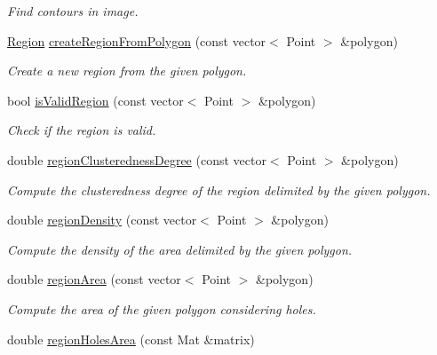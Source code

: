 \begin{DoxyCompactItemize}
\begin{DoxyCompactList}\small\item\em Find contours in image. \end{DoxyCompactList}\item 
\hyperlink{classmultiscale_1_1analysis_1_1Region}{Region} \hyperlink{classmultiscale_1_1analysis_1_1RegionDetector_a1416b365f921e02e5161d72b0b69f287}{create\-Region\-From\-Polygon} (const vector$<$ Point $>$ \&polygon)
\begin{DoxyCompactList}\small\item\em Create a new region from the given polygon. \end{DoxyCompactList}\item 
bool \hyperlink{classmultiscale_1_1analysis_1_1RegionDetector_a2be058ae797d80787725ae2c246ba256}{is\-Valid\-Region} (const vector$<$ Point $>$ \&polygon)
\begin{DoxyCompactList}\small\item\em Check if the region is valid. \end{DoxyCompactList}\item 
double \hyperlink{classmultiscale_1_1analysis_1_1RegionDetector_a89995b72e578951ea7ddf43c5c25e14a}{region\-Clusteredness\-Degree} (const vector$<$ Point $>$ \&polygon)
\begin{DoxyCompactList}\small\item\em Compute the clusteredness degree of the region delimited by the given polygon. \end{DoxyCompactList}\item 
double \hyperlink{classmultiscale_1_1analysis_1_1RegionDetector_a6beb6b2ecaccd60130bcf8dd808750b8}{region\-Density} (const vector$<$ Point $>$ \&polygon)
\begin{DoxyCompactList}\small\item\em Compute the density of the area delimited by the given polygon. \end{DoxyCompactList}\item 
double \hyperlink{classmultiscale_1_1analysis_1_1RegionDetector_a938fa8d165c87dc69e962883942072d2}{region\-Area} (const vector$<$ Point $>$ \&polygon)
\begin{DoxyCompactList}\small\item\em Compute the area of the given polygon considering holes. \end{DoxyCompactList}\item 
double \hyperlink{classmultiscale_1_1analysis_1_1RegionDetector_ab110a0a67852484c700ff035089fce18}{region\-Holes\-Area} (const Mat \&matrix)

\end{DoxyCompactItemize}
